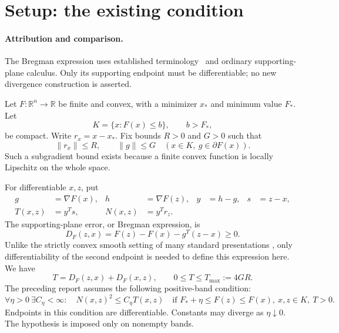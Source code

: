 \begingroup
\providecommand{\R}{}
\renewcommand{\R}{\mathbb R}
\providecommand{\ip}{}
\renewcommand{\ip}[2]{\langle #1,#2\rangle}
\providecommand{\DF}{}
\renewcommand{\DF}{D_F}
\providecommand{\st}{}
\renewcommand{\st}{x_*}
\providecommand{\fs}{}
\renewcommand{\fs}{F_*}
\makeatletter\let\c@lemma\c@theorem\let\c@corollary\c@theorem\let\c@proposition\c@theorem\let\c@remark\c@theorem\makeatother
\renewcommand{\thelemma}{\thetheorem}\renewcommand{\thecorollary}{\thetheorem}\renewcommand{\theproposition}{\thetheorem}\renewcommand{\theremark}{\thetheorem}
\renewcommand{\thetheorem}{R.\arabic{section}.\arabic{theorem}}
\setcounter{section}{0}
\setcounter{theorem}{0}
\setcounter{equation}{0}
\section{Setup: the existing condition}
\paragraph{Attribution and comparison.}
The Bregman expression uses established terminology~\cite[Definition~1]{BB} and ordinary supporting-plane calculus. Only its supporting endpoint must be differentiable; no new divergence construction is asserted.

Let $F:\R^n\to\R$ be finite and convex, with a minimizer $\st$ and minimum value $\fs$. Let
\[
 K=\{x:F(x)\le b\},\qquad b>\fs,
\]
be compact. Write $r_x=x-\st$. Fix bounds $R>0$ and $G>0$ such that
\[
 \|r_x\|\le R,\qquad \|g\|\le G\quad(x\in K,\ g\in\partial F(x)).
\]
Such a subgradient bound exists because a finite convex function is locally Lipschitz on the whole space.

For differentiable $x,z$, put
\begin{align*}
 g&=\nabla F(x),& h&=\nabla F(z),&y&=h-g,&s&=z-x,\\
 T(x,z)&=y^Ts,&N(x,z)&=y^Tr_z.
\end{align*}
The supporting-plane error, or Bregman expression, is
\[
 \DF(z,x)=F(z)-F(x)-g^T(z-x)\ge0.
\]
Unlike the strictly convex smooth setting of many standard presentations \cite{BB}, only differentiability of the second endpoint is needed to define this expression here. We have
\[
 T=\DF(z,x)+\DF(x,z),\qquad 0\le T\le T_{\max}:=4GR.
\]
The preceding report assumes the following positive-band condition:
\begin{equation}
 \forall\eta>0\ \exists C_\eta<\infty:\quad
 N(x,z)^2\le C_\eta T(x,z)
 \quad\text{if }\fs+\eta\le F(z)\le F(x),\ x,z\in K,\ T>0.
 \tag{R.RS}\label{R:eq:RS}
\end{equation}
Endpoints in this condition are differentiable. Constants may diverge as $\eta\downarrow0$. The hypothesis is imposed only on nonempty bands.


